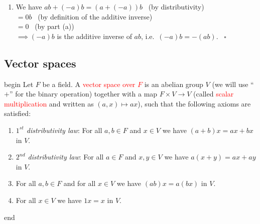 \documentclass[
  12pt,
  a4paper,
  twoside]{article}
\providecommand{\tightlist}{%
  \setlength{\itemsep}{0pt}\setlength{\parskip}{0pt}}
\theoremstyle{plain}
\theoremstyle{definition}
\begin{document}
\begin{enumerate}
\def\labelenumi{(\alph{enumi})}
\setcounter{enumi}{1}
\tightlist
\item
  We have \(ab + (-a)b = (a + (-a))b\) \hfill~{(by distributivity)}\\
  \hspace*{0.333em}\hspace*{0.333em}\hspace*{0.333em}\hspace*{0.333em}\(= 0b\) \hfill~{(by definition of the additive inverse)}\\
  \hspace*{0.333em}\hspace*{0.333em}\hspace*{0.333em}\hspace*{0.333em}\(= 0\) \hfill~{(by part (a))}\\
  \(\implies (-a)b\) is the additive inverse of \(ab\), i.e.~\((-a)b = -(ab)\).
  \hfill~{\(\square\)}
\end{enumerate}

\hypertarget{ss-vector-spaces}{%
\subsection{Vector spaces}\label{ss-vector-spaces}}

\csname begin\label{cnj:defn-vectorspace}
Let \(F\) be a field. A \textcolor{red}{vector space over $F$} is an abelian group \(V\) (we will use ``\(+\)'' for the binary operation) together with a map \(F \times V \to V\) (called \textcolor{red}{scalar multiplication} and written as \((a,x) \mapsto ax\)), such that the following axioms are satisfied:

\begin{enumerate}
\def\labelenumi{(\roman{enumi})}
\tightlist
\item
  \emph{\(1^{st}\) distributivity law}: For all \(a,b \in F\) and \(x \in V\) we have \((a + b)x = ax + bx\) in \(V\).
\item
  \emph{\(2^{nd}\) distributivity law}: For all \(a\in F\) and \(x,y \in V\) we have \(a(x + y) = ax + ay\) in \(V\).
\item
  For all \(a, b \in F\) and for all \(x \in V\) we have \((ab)x = a(bx)\) in \(V\).
\item
  For all \(x \in V\) we have \(1x = x\) in \(V\).
\end{enumerate}

\csname end
\end{document}
